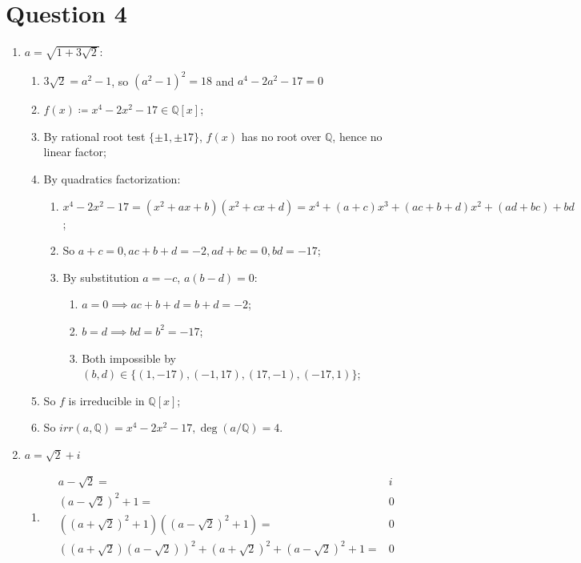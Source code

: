 \documentclass[11pt]{article}
\newcommand{\QQ}{\mathbb{Q}}
\begin{document}
\newpage

\section*{Question 4}

\begin{enumerate}
    \item $a=\sqrt{1+3\sqrt{2}}$:
    \begin{enumerate}
        \item $3\sqrt{2}=a^2-1$, so $(a^2-1)^2=18$ and $a^4-2a^2-17=0$
        \item $f(x)\coloneqq x^4-2x^2-17\in\QQ[x]$;
        \item By rational root test $\{\pm1,\pm17\}$, $f(x)$ has no root over $\QQ$, hence no linear factor;
        \item By quadratics factorization: 
        \begin{enumerate}
            \item $x^4-2x^2-17=(x^2+ax+b)(x^2+cx+d)=x^4+(a+c)x^3+(ac+b+d)x^2+(ad+bc)+bd$;
        \item So $a+c=0,ac+b+d=-2,ad+bc=0,bd=-17$;
        \item By substitution $a=-c$, $a(b-d)=0$:
        \begin{enumerate}
            \item $a=0\implies ac+b+d=b+d=-2$; 
            \item $b=d\implies bd=b^2=-17$;
            \item Both impossible by  $(b,d)\in\{(1,-17),(-1,17),(17,-1),(-17,1)\} $;
        \end{enumerate}
        \end{enumerate}
        \item So $f$ is irreducible in $\QQ[x]$;
        \item So $irr(a,\QQ)=x^4-2x^2-17,\deg (a/\QQ)=4$.
    \end{enumerate}
    \item $a=\sqrt{2}+i$
    \begin{enumerate}
        \item \begin{align*}
            a-\sqrt{2}=&i\\
            (a-\sqrt{2})^2+1=&0\\
            ((a+\sqrt{2})^2+1)((a-\sqrt{2})^2+1)=&0\\
            ((a+\sqrt{2})(a-\sqrt{2}))^2+(a+\sqrt{2})^2+(a-\sqrt{2})^2+1=&0\\

\end{align*}
\end{enumerate}
\end{enumerate}
\end{document}
